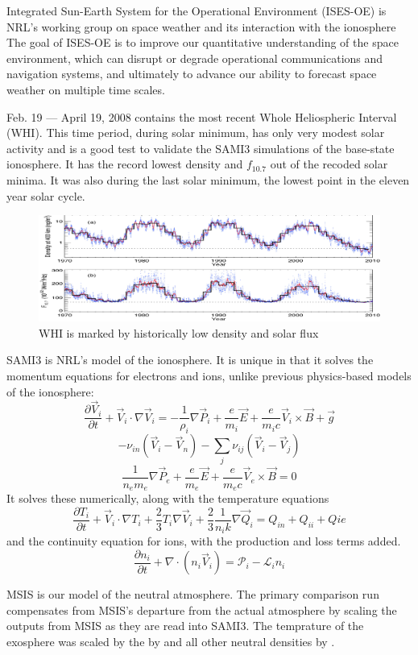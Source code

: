 \documentclass[12pt]{article}
\begin{document}
{Integrated Sun-Earth System for the Operational Environment (ISES-OE)} is NRL's working group on space weather and its interaction with the ionosphere
    The goal of ISES-OE is to improve our quantitative understanding of the space environment, which can disrupt or degrade operational communications and navigation systems, and ultimately to advance our ability to forecast space weather on multiple time scales.
  
  Feb. 19 --- April 19, 2008 contains the most recent Whole Heliospheric Interval (WHI).  This time period, during solar minimum, has only very modest solar activity and is a good test to validate the SAMI3 simulations of the base-state ionosphere. It has the record lowest density and $f_{10.7}$ out of the recoded solar minima. It was also during the last solar minimum, the lowest point in the eleven year solar cycle.
  \begin{figure}
    \includegraphics[width=.5\textwidth]{whi}
    \caption{WHI is marked by historically low density and solar flux}
  \end{figure}

  
  SAMI3 is NRL's model of the ionosphere. It is unique in that it solves the momentum equations for electrons and ions, unlike previous physics-based models of the ionosphere:
  \[ \frac{\partial \vec V_i}{\partial t} + \vec V_i \cdot \nabla \vec V_i = 
     -\frac1{\rho_i} \nabla\vec P_i 
     + \frac e{m_i}\vec E + \frac e{m_ic} \vec V_i \times \vec B 
     +\vec g \]
  \[  -\nu_{in} \left( \vec V_i -\vec V_n \right)
     -\sum_j \nu_{ij} \left( \vec V_i -\vec V_j\right) \]
  \[\frac1{n_e m_e} \nabla \vec P_e + \frac e{m_e} \vec E + \frac e{m_ec} \vec V_e \times \vec B = 0 \]
It solves these numerically, along with the temperature equations
  \[\frac{\partial T_i}{\partial t} + \vec V_i \cdot \nabla T_i + \frac23 T_i \nabla \vec V_i 
  +\frac23 \frac1{n_i k} \nabla \vec Q_i =Q_{in} + Q_{ii} +Q{ie} \]
  and the continuity equation for ions, with the production and loss terms added.
  \[ \frac{\partial n_i}{\partial t} + \nabla \cdot \left( n_i\vec V_i \right) = \mathcal P_i - \mathcal L_i n_i \]
  
  MSIS is our model of the neutral atmosphere.  The primary comparison run compensates from MSIS's departure from the actual atmosphere by scaling the outputs from MSIS as they are read into SAMI3. The temprature of the exosphere was scaled by  the \smash{$[O]$} by  and all other neutral densities by . 
\end{document}
